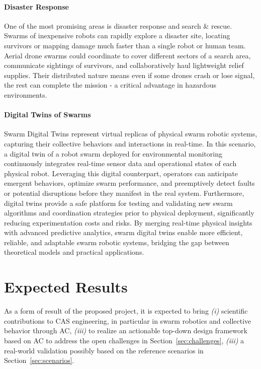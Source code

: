 \documentclass[12pt]{article}
\begin{document}
\paragraph{Disaster Response} One of the most promising areas is disaster response and search \& rescue. Swarms of inexpensive robots can rapidly explore a disaster site, 
locating survivors or mapping damage much faster than a single robot or human team. 
Aerial drone swarms could coordinate to cover different sectors of a search area, communicate sightings of survivors, and collaboratively haul lightweight relief supplies. Their distributed nature means even if some drones crash or lose signal, the rest can complete the mission - a critical advantage in hazardous environments.



\paragraph{Digital Twins of Swarms}
Swarm Digital Twins represent virtual replicas of physical swarm robotic systems, capturing their collective behaviors and interactions in real-time. 
In this scenario, a digital twin of a robot swarm deployed for environmental monitoring continuously integrates real-time sensor data and operational states of each physical robot. 
Leveraging this digital counterpart, operators can anticipate emergent behaviors, optimize swarm performance, and preemptively detect faults or potential disruptions before they manifest in the real system. 
Furthermore, digital twins provide a safe platform for testing and validating new swarm algorithms and coordination strategies prior to physical deployment, significantly reducing experimentation costs and risks. 
By merging real-time physical insights with advanced predictive analytics, swarm digital twins enable more efficient, reliable, and adaptable swarm robotic systems, bridging the gap between theoretical models and practical applications.

\section{Expected Results}
As a form of result of the proposed project, it is expected to bring \textit{(i)} scientific contributions to CAS engineering, in particular in swarm robotics and collective behavior through AC,
\textit{(iii)} to realize an actionable top-down design framework based on AC to address the open challenges in Section~\ref{sec:challenges}, \textit{(iii)} a real-world validation possibly based on the reference scenarios in Section~\ref{sec:scenarios}.
\end{document}
